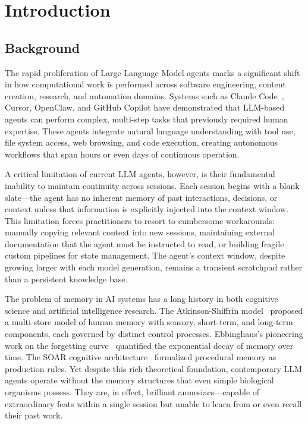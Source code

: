 \documentclass[11pt]{article}
\begin{document}
\section{Introduction}

\subsection{Background}

The rapid proliferation of Large Language Model agents marks a significant shift in how computational work is performed across software engineering, content creation, research, and automation domains. Systems such as Claude Code~\cite{anthropic2024mcp}, Cursor, OpenClaw, and GitHub Copilot have demonstrated that LLM-based agents can perform complex, multi-step tasks that previously required human expertise. These agents integrate natural language understanding with tool use, file system access, web browsing, and code execution, creating autonomous workflows that span hours or even days of continuous operation.

A critical limitation of current LLM agents, however, is their fundamental inability to maintain continuity across sessions. Each session begins with a blank slate---the agent has no inherent memory of past interactions, decisions, or context unless that information is explicitly injected into the context window. This limitation forces practitioners to resort to cumbersome workarounds: manually copying relevant context into new sessions, maintaining external documentation that the agent must be instructed to read, or building fragile custom pipelines for state management. The agent's context window, despite growing larger with each model generation, remains a transient scratchpad rather than a persistent knowledge base.

The problem of memory in AI systems has a long history in both cognitive science and artificial intelligence research. The Atkinson-Shiffrin model~\cite{atkinson1968human} proposed a multi-store model of human memory with sensory, short-term, and long-term components, each governed by distinct control processes. Ebbinghaus's pioneering work on the forgetting curve~\cite{ebbinghaus1885} quantified the exponential decay of memory over time. The SOAR cognitive architecture~\cite{laird2017standard} formalized procedural memory as production rules. Yet despite this rich theoretical foundation, contemporary LLM agents operate without the memory structures that even simple biological organisms possess. They are, in effect, brilliant amnesiacs---capable of extraordinary feats within a single session but unable to learn from or even recall their past work.
\end{document}

